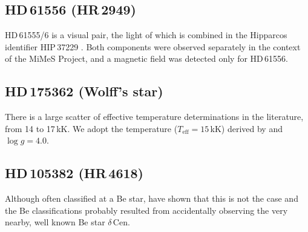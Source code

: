 \documentclass[useAMS,usenatbib]{mn2e}
\newcommand{\teff}{T_\mathrm{eff}}
\begin{document}
\setcounter{subsection}{59}	
\subsection{HD\,61556 (HR\,2949)}

HD\,61555/6 is a visual pair, the light of which is combined in the Hipparcos identifier HIP\,37229 \citep{2003IBVS.5397....1R}. Both components were observed separately in the context of the MiMeS Project, and a magnetic field was detected only for HD\,61556. 

\setcounter{subsection}{60}	
\subsection{HD\,175362 (Wolff's star)}

There is a large scatter of effective temperature determinations in the literature, from 14 to 17\,kK. We adopt the temperature ($\teff=15$\,kK) derived by \citet{1997A&A...320..257L} and $\log g=4.0$.

\setcounter{subsection}{61}	
\subsection{HD\,105382 (HR\,4618)}

Although often classified at a Be star, \citet{2001A&A...366..121B} have shown that this is not the case and the Be classifications probably resulted from accidentally observing the very nearby, well known Be star $\delta$\,Cen. 
	
\end{document}
